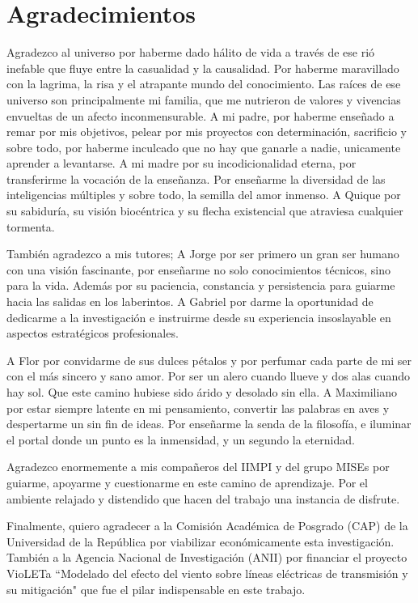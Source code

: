 \chapter*{Agradecimientos}

Agradezco al universo por haberme dado hálito de vida a través de ese rió inefable que fluye entre la casualidad y la causalidad. Por haberme maravillado con la lagrima, la risa y el atrapante mundo del conocimiento. Las raíces de ese universo son principalmente mi familia, que me nutrieron de valores y vivencias envueltas de un afecto inconmensurable. A mi padre, por haberme enseñado a remar por mis objetivos, pelear por mis proyectos con determinación, sacrificio y sobre todo, por haberme inculcado que no hay que ganarle a nadie, unicamente aprender a levantarse. A mi madre por su incodicionalidad eterna, por transferirme la vocación de la enseñanza. Por enseñarme la diversidad de las inteligencias múltiples y sobre todo, la semilla del amor inmenso. A Quique por su sabiduría, su visión biocéntrica y su flecha existencial que atraviesa cualquier tormenta. 

También agradezco a mis tutores; A Jorge por ser primero un gran ser humano con una visión fascinante, por enseñarme no solo conocimientos técnicos, sino para la vida. Además por su paciencia, constancia y persistencia para guiarme hacia las salidas en los laberintos. A Gabriel por darme la oportunidad de dedicarme a la investigación e instruirme desde su experiencia insoslayable en aspectos estratégicos profesionales.   

A Flor por convidarme de sus dulces pétalos y por perfumar cada parte de mi ser con el más sincero y sano amor. Por ser un alero cuando llueve y dos alas cuando hay sol. Que este camino hubiese sido árido y desolado sin ella. A Maximiliano por estar siempre latente en mi pensamiento, convertir las palabras en aves y despertarme un sin fin de ideas. Por enseñarme la senda de la filosofía, e iluminar el portal donde un punto es la inmensidad, y un segundo la eternidad.

Agradezco enormemente a mis compañeros del IIMPI y del grupo MISEs por guiarme, apoyarme y cuestionarme en este camino de aprendizaje. Por el ambiente relajado y distendido que hacen del trabajo una instancia de disfrute.

Finalmente, quiero agradecer a la Comisión Académica de Posgrado (CAP) de la Universidad de la República por viabilizar económicamente esta investigación. También a la Agencia Nacional de Investigación (ANII) por financiar el proyecto VioLETa ``Modelado del efecto del viento sobre líneas eléctricas de  transmisión y su mitigación" que fue el pilar indispensable en este trabajo.